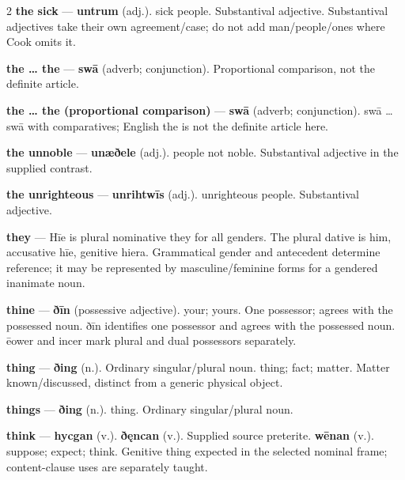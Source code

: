 \begin{multicols}{2}
\textbf{the sick} — \textbf{untrum} (adj.). sick people. Substantival adjective. Substantival adjectives take their own agreement/case; do not add man/people/ones where Cook omits it.\par
\textbf{the … the} — \textbf{swā} (adverb; conjunction). Proportional comparison, not the definite article.\par
\textbf{the … the (proportional comparison)} — \textbf{swā} (adverb; conjunction). swā … swā with comparatives; English the is not the definite article here.\par
\textbf{the unnoble} — \textbf{unæðele} (adj.). people not noble. Substantival adjective in the supplied contrast.\par
\textbf{the unrighteous} — \textbf{unrihtwīs} (adj.). unrighteous people. Substantival adjective.\par
\textbf{they} — Hīe is plural nominative they for all genders. The plural dative is him, accusative hīe, genitive hiera. Grammatical gender and antecedent determine reference; it may be represented by masculine/feminine forms for a gendered inanimate noun.\par
\textbf{thine} — \textbf{ðīn} (possessive adjective). your; yours. One possessor; agrees with the possessed noun. ðīn identifies one possessor and agrees with the possessed noun. ēower and incer mark plural and dual possessors separately.\par
\textbf{thing} — \textbf{ðing} (n.). Ordinary singular/plural noun. thing; fact; matter. Matter known/discussed, distinct from a generic physical object.\par
\textbf{things} — \textbf{ðing} (n.). thing. Ordinary singular/plural noun.\par
\textbf{think} — \textbf{hycgan} (v.).  \textbf{ðęncan} (v.). Supplied source preterite. \textbf{wēnan} (v.). suppose; expect; think. Genitive thing expected in the selected nominal frame; content-clause uses are separately taught.\par

\end{multicols}
